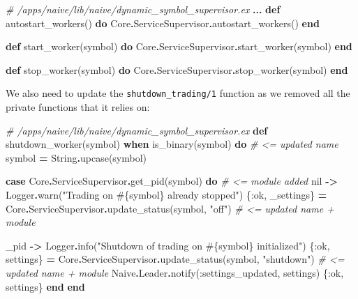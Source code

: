 \documentclass[
]{book}
\newenvironment{Shaded}{\begin{snugshade}}{\end{snugshade}}
\newcommand{\CommentTok}[1]{\textcolor[rgb]{0.56,0.35,0.01}{\textit{#1}}}
\newcommand{\ConstantTok}[1]{\textcolor[rgb]{0.00,0.00,0.00}{#1}}
\newcommand{\KeywordTok}[1]{\textcolor[rgb]{0.13,0.29,0.53}{\textbf{#1}}}
\newcommand{\NormalTok}[1]{#1}
\newcommand{\OperatorTok}[1]{\textcolor[rgb]{0.81,0.36,0.00}{\textbf{#1}}}
\newcommand{\OtherTok}[1]{\textcolor[rgb]{0.56,0.35,0.01}{#1}}
\newcommand{\StringTok}[1]{\textcolor[rgb]{0.31,0.60,0.02}{#1}}
\newcommand{\VariableTok}[1]{\textcolor[rgb]{0.00,0.00,0.00}{#1}}
\begin{document}
\begin{Shaded}
\begin{Highlighting}[]
  \CommentTok{\# /apps/naive/lib/naive/dynamic\_symbol\_supervisor.ex}
  \OperatorTok{...}
  \KeywordTok{def}\NormalTok{ autostart\_workers() }\KeywordTok{do}
    \ConstantTok{Core}\OperatorTok{.}\ConstantTok{ServiceSupervisor}\OperatorTok{.}\NormalTok{autostart\_workers()}
  \KeywordTok{end}

  \KeywordTok{def}\NormalTok{ start\_worker(symbol) }\KeywordTok{do}
    \ConstantTok{Core}\OperatorTok{.}\ConstantTok{ServiceSupervisor}\OperatorTok{.}\NormalTok{start\_worker(symbol)}
  \KeywordTok{end}

  \KeywordTok{def}\NormalTok{ stop\_worker(symbol) }\KeywordTok{do}
    \ConstantTok{Core}\OperatorTok{.}\ConstantTok{ServiceSupervisor}\OperatorTok{.}\NormalTok{stop\_worker(symbol)}
  \KeywordTok{end}
\end{Highlighting}
\end{Shaded}

We also need to update the \texttt{shutdown\_trading/1} function as we removed all the private functions that it relies on:

\begin{Shaded}
\begin{Highlighting}[]
  \CommentTok{\# /apps/naive/lib/naive/dynamic\_symbol\_supervisor.ex}
  \KeywordTok{def}\NormalTok{ shutdown\_worker(symbol) }\KeywordTok{when}\NormalTok{ is\_binary(symbol) }\KeywordTok{do} \CommentTok{\# \textless{}= updated name}
\NormalTok{    symbol }\OperatorTok{=} \ConstantTok{String}\OperatorTok{.}\NormalTok{upcase(symbol)}

    \KeywordTok{case} \ConstantTok{Core}\OperatorTok{.}\ConstantTok{ServiceSupervisor}\OperatorTok{.}\NormalTok{get\_pid(symbol) }\KeywordTok{do} \CommentTok{\# \textless{}= module added}
      \ConstantTok{nil} \OperatorTok{{-}\textgreater{}}
        \ConstantTok{Logger}\OperatorTok{.}\NormalTok{warn(}\StringTok{"Trading on }\OtherTok{\#\{}\NormalTok{symbol}\OtherTok{\}}\StringTok{ already stopped"}\NormalTok{)}
\NormalTok{        \{}\VariableTok{:ok}\NormalTok{, \_settings\} }\OperatorTok{=} \ConstantTok{Core}\OperatorTok{.}\ConstantTok{ServiceSupervisor}\OperatorTok{.}\NormalTok{update\_status(symbol, }\StringTok{"off"}\NormalTok{) }\CommentTok{\# \textless{}= updated name + module}

\NormalTok{      \_pid }\OperatorTok{{-}\textgreater{}}
        \ConstantTok{Logger}\OperatorTok{.}\NormalTok{info(}\StringTok{"Shutdown of trading on }\OtherTok{\#\{}\NormalTok{symbol}\OtherTok{\}}\StringTok{ initialized"}\NormalTok{)}
\NormalTok{        \{}\VariableTok{:ok}\NormalTok{, settings\} }\OperatorTok{=} \ConstantTok{Core}\OperatorTok{.}\ConstantTok{ServiceSupervisor}\OperatorTok{.}\NormalTok{update\_status(symbol, }\StringTok{"shutdown"}\NormalTok{) }\CommentTok{\# \textless{}= updated name + module}
        \ConstantTok{Naive}\OperatorTok{.}\ConstantTok{Leader}\OperatorTok{.}\NormalTok{notify(}\VariableTok{:settings\_updated}\NormalTok{, settings)}
\NormalTok{        \{}\VariableTok{:ok}\NormalTok{, settings\}}
    \KeywordTok{end}
  \KeywordTok{end}
\end{Highlighting}
\end{Shaded}
\end{document}
